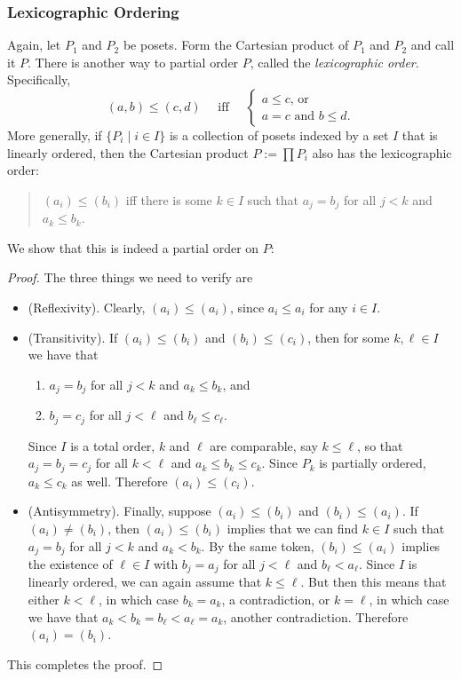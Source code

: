 \documentclass[12pt]{article}
\begin{document}
\subsubsection*{Lexicographic Ordering}
Again, let $P_1$ and $P_2$ be posets.  Form the Cartesian product of $P_1$ and $P_2$ and call it $P$.  There is another way to partial order $P$, called the \emph{lexicographic order}.  Specifically, 
$$
(a,b)\le (c,d)\quad\mbox{ iff }\quad\begin{cases}
a\le c\mbox{, or }\\
a=c\mbox{ and }b\le d.
\end{cases}
$$
More generally, if $\lbrace P_i\mid i\in I\rbrace$ is a collection of posets indexed by a set $I$ that is linearly ordered, then the Cartesian product $P:=\prod P_i$ also has the lexicographic order: 
\begin{quote}
$(a_i)\le (b_i)$ iff there is some $k\in I$ such that $a_j=b_j$ for all $j< k$ and $a_k\le b_k$.  
\end{quote}
We show that this is indeed a partial order on $P$:
\begin{proof}  The three things we need to verify are
\begin{itemize}
\item (Reflexivity).  Clearly, $(a_i)\le (a_i)$, since $a_i\le a_i$ for any $i\in I$.  
\item (Transitivity).  If $(a_i)\le (b_i)$ and $(b_i)\le (c_i)$, then for some $k,\ell\in I$ we have that 
\begin{enumerate}
\item
$a_j=b_j$ for all $j<k$ and $a_k\le b_k$, and 
\item
$b_j=c_j$ for all $j<\ell$ and $b_{\ell}\le c_{\ell}$.  
\end{enumerate}
Since $I$ is a total order, $k$ and $\ell$ are comparable, say $k\le \ell$, so that $a_j=b_j=c_j$ for all $k<\ell$ and $a_k\le b_k\le c_k$.  Since $P_k$ is partially ordered, $a_k\le c_k$ as well.  Therefore $(a_i)\le (c_i)$.  
\item (Antisymmetry).  Finally, suppose $(a_i)\le (b_i)$ and $(b_i)\le (a_i)$.  If $(a_i)\ne (b_i)$, then $(a_i)\le (b_i)$ implies that we can find $k\in I$ such that $a_j=b_j$ for all $j<k$ and $a_k<b_k$.  By the same token, $(b_i)\le (a_i)$ implies the existence of $\ell\in I$ with $b_j=a_j$ for all $j<\ell$ and $b_{\ell}<a_{\ell}$.  Since $I$ is linearly ordered, we can again assume that $k\le \ell$.  But then this means that either $k<\ell$, in which case $b_k=a_k$, a contradiction, or $k=\ell$, in which case we have that $a_k<b_k=b_{\ell}<a_{\ell}=a_k$, another contradiction.  Therefore $(a_i)=(b_i)$.
\end{itemize}  This completes the proof.
\end{proof}
\end{document}
